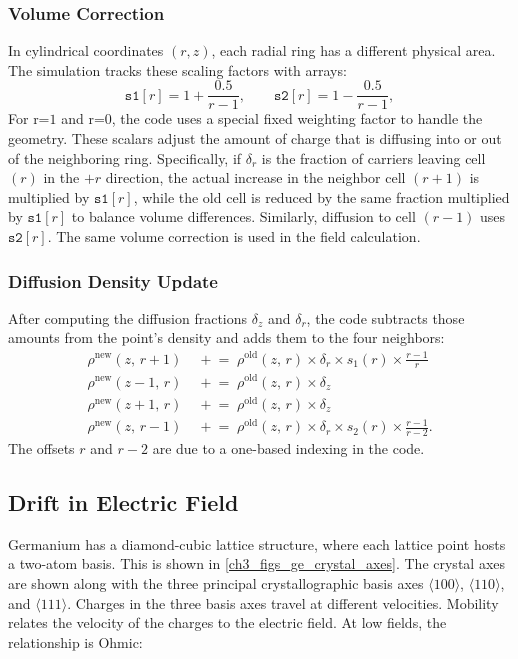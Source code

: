 \subsubsection*{Volume Correction}
In cylindrical coordinates $(r,z)$, each radial ring has a different physical area. The simulation tracks these scaling factors with arrays:
\[
\texttt{s1}[r] = 1 + \frac{0.5}{r-1}, 
\qquad
\texttt{s2}[r] = 1 - \frac{0.5}{r-1},
\] 
For r=$1$ and r=$0$, the code uses a special fixed weighting factor to handle the geometry. These scalars adjust the amount of charge that is diffusing into or out of the neighboring ring. Specifically, if $\delta_r$ is the fraction of carriers leaving cell $(r)$ in
the $+r$ direction, the actual increase in the neighbor cell
$(r+1)$ is multiplied by $\texttt{s1}[r]$, while the old cell is
reduced by the same fraction multiplied by $\texttt{s1}[r]$ to
balance volume differences. Similarly, diffusion to cell $(r-1)$ 
uses $\texttt{s2}[r]$. The same volume correction is used in the field calculation.

\subsubsection*{Diffusion Density Update}
After computing the diffusion fractions $\delta_z$ and $\delta_r$, the code subtracts those amounts from the point's density and adds them to the four neighbors:
\begin{align}
  \rho^{\mathrm{new}}(z,\,r+1) &\;\mathrel{+}= \;\rho^{\mathrm{old}}(z,\,r)\times\delta_r \times s_1(r) \times \frac{r-1}{r} \label{ch3:eq:diffusion_update_1} \\
  \rho^{\mathrm{new}}(z-1,\,r) &\;\mathrel{+}= \;\rho^{\mathrm{old}}(z,\,r)\times\delta_z \label{ch3:eq:diffusion_update_2} \\
  \rho^{\mathrm{new}}(z+1,\,r) &\;\mathrel{+}= \;\rho^{\mathrm{old}}(z,\,r)\times\delta_z \label{ch3:eq:diffusion_update_3} \\
  \rho^{\mathrm{new}}(z,\,r-1) &\;\mathrel{+}= \;\rho^{\mathrm{old}}(z,\,r) \times \delta_r \times s_2(r) \times\frac{r-1}{r-2} \label{ch3:eq:diffusion_update_4}.
\end{align}
 The offsets $r$ and $r-2$ are due to a one-based indexing in the code.
 
\subsection{Drift in Electric Field}
Germanium has a diamond-cubic lattice structure, where each lattice point hosts a two-atom basis. This is shown in \ref{ch3_figs_ge_crystal_axes}. The crystal axes are shown along with the three principal crystallographic basis axes $\langle 100\rangle$, $\langle 110\rangle$, and $\langle 111\rangle$. Charges in the three basis axes travel at different velocities. Mobility relates the velocity of the charges to the electric field. At low fields, the relationship is Ohmic:


